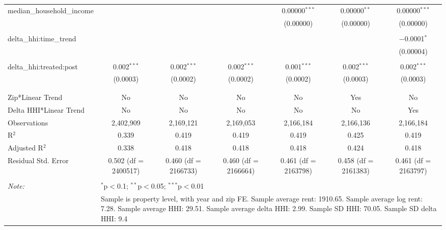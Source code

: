 \begin{table}[H]
{\begin{tabular}{@{\extracolsep{5pt}}lcccccc}
  median\_household\_income &  &  &  & 0.00000$^{***}$ & 0.00000$^{**}$ & 0.00000$^{***}$ \\  

   &  &  &  & (0.00000) & (0.00000) & (0.00000) \\  

   & & & & & & \\  

  delta\_hhi:time\_trend &  &  &  &  &  & $-$0.0001$^{*}$ \\  

   &  &  &  &  &  & (0.00004) \\  

   & & & & & & \\  

  delta\_hhi:treated:post & 0.002$^{***}$ & 0.002$^{***}$ & 0.002$^{***}$ & 0.001$^{***}$ & 0.002$^{***}$ & 0.002$^{***}$ \\  

   & (0.0003) & (0.0002) & (0.0002) & (0.0002) & (0.0003) & (0.0003) \\  

   & & & & & & \\  

 \hline \\[-1.8ex]  

 Zip*Linear Trend & No & No & No & No & Yes & No \\  

 Delta HHI*Linear Trend & No & No & No & No & No & Yes \\  

 Observations & 2,402,909 & 2,169,121 & 2,169,053 & 2,166,184 & 2,166,136 & 2,166,184 \\  

 R$^{2}$ & 0.339 & 0.419 & 0.419 & 0.419 & 0.425 & 0.419 \\  

 Adjusted R$^{2}$ & 0.338 & 0.418 & 0.418 & 0.418 & 0.424 & 0.418 \\  

 Residual Std. Error & 0.502 (df = 2400517) & 0.460 (df = 2166733) & 0.460 (df = 2166664) & 0.461 (df = 2163798) & 0.458 (df = 2161383) & 0.461 (df = 2163797) \\  

 \hline  

 \hline \\[-1.8ex]  

 \textit{Note:}  & \multicolumn{6}{l}{$^{*}$p$<$0.1; $^{**}$p$<$0.05; $^{***}$p$<$0.01} \\  

  & \multicolumn{6}{l}{Sample is property level, with year and zip FE. Sample average rent: 1910.65. Sample average log rent: 7.28. Sample average HHI: 29.51. Sample average delta HHI: 2.99. Sample SD HHI: 70.05. Sample SD delta HHI: 9.4} \\  

 \end{tabular}}  

 \end{table}  

